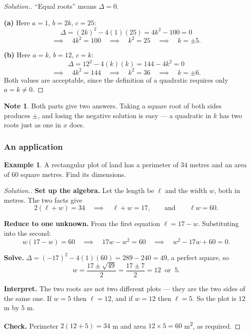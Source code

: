 \documentclass[11pt,a4paper]{article}
\theoremstyle{definition}
\newtheorem{example}[thm]{Example}
\newtheorem{note}[thm]{Note}
\newenvironment{solution}
  {\renewcommand{\qedsymbol}{}\begin{proof}[\textit{Solution}.]}
  {\end{proof}}
\begin{document}
\begin{solution}
``Equal roots'' means $\Delta=0$.

\textbf{(a)} Here $a=1$, $b=2k$, $c=25$:
$$\Delta=(2k)^2-4(1)(25)=4k^2-100=0$$
$$\implies\quad 4k^2=100\quad\implies\quad k^2=25\quad\implies\quad k=\pm 5.$$

\textbf{(b)} Here $a=k$, $b=12$, $c=k$:
$$\Delta=12^2-4(k)(k)=144-4k^2=0$$
$$\implies\quad 4k^2=144\quad\implies\quad k^2=36\quad\implies\quad k=\pm 6.$$
Both values are acceptable, since the definition of a quadratic requires only
$a=k\neq 0$.
\end{solution}

\begin{note}
Both parts give two answers. Taking a square root of both sides produces $\pm$, and
losing the negative solution is easy --- a quadratic in $k$ has two roots just as one
in $x$ does.
\end{note}

\subsubsection{An application}

\begin{example}
A rectangular plot of land has a perimeter of $34$ metres and an area of $60$ square
metres. Find its dimensions.
\end{example}

\begin{solution}
\textbf{Set up the algebra.} Let the length be $\ell$ and the width $w$, both in
metres. The two facts give
$$2(\ell+w)=34\quad\implies\quad \ell+w=17,\qquad\text{and}\qquad \ell w=60.$$

\textbf{Reduce to one unknown.} From the first equation $\ell=17-w$. Substituting into
the second:
$$w(17-w)=60\quad\implies\quad 17w-w^2=60\quad\implies\quad w^2-17w+60=0.$$

\textbf{Solve.} $\Delta=(-17)^2-4(1)(60)=289-240=49$, a perfect square, so
$$w=\frac{17\pm\sqrt{49}}{2}=\frac{17\pm 7}{2}=12\ \text{ or }\ 5.$$

\textbf{Interpret.} The two roots are not two different plots --- they are the two
sides of the same one. If $w=5$ then $\ell=12$, and if $w=12$ then $\ell=5$. So the
plot is $12$ m by $5$ m.

\textbf{Check.} Perimeter $2(12+5)=34$ m and area $12\times 5=60$ m\textsuperscript{2},
as required.
\end{solution}
\end{document}
